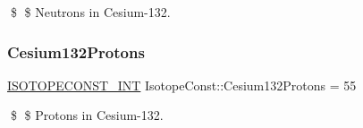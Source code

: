 \$ \$ Neutrons in Cesium-\/132. \mbox{\label{group___isotope_const-_cesium-_cs132_ga9fd4b6f5ef30a589c721311ac0ff06fd}} 
\subsubsection{\texorpdfstring{Cesium132\+Protons}{Cesium132Protons}}
{\footnotesize\ttfamily \mbox{\hyperlink{group___isotope_const-_macros_ga5f18360b3e99483a35c32d789e62621c}{I\+S\+O\+T\+O\+P\+E\+C\+O\+N\+S\+T\+\_\+\+I\+NT}} Isotope\+Const\+::\+Cesium132\+Protons = 55}

\$ \$ Protons in Cesium-\/132. 
